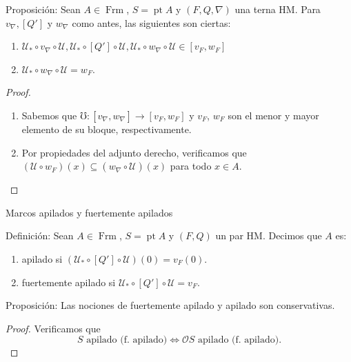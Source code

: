 \documentclass[compress,12pt]{beamer}
\DeclareMathOperator{\pt}{pt}
\DeclareMathOperator{\Frm}{Frm}
\begin{document}
\begin{frame}
\begin{block}{Proposición:}
Sean $A\in \Frm$, $S=\pt A$ y $(F, Q, \nabla)$ una terna HM. Para $v_\nabla, [Q']$ y $w_\nabla$ como antes, las siguientes son ciertas:
\begin{enumerate}
\item $\mathcal{U}_*\circ v_\nabla\circ \mathcal{U}, \mathcal{U}_*\circ [Q']\circ \mathcal{U}, \mathcal{U}_*\circ w_\nabla\circ \mathcal{U}\in [v_F, w_F]$
\item $\mathcal{U}_*\circ w_\nabla\circ \mathcal{U}=w_F$.
\end{enumerate}
\end{block}

\begin{proof}
\begin{enumerate}
\item Sabemos que $\mho\colon [v_\nabla, w_\nabla]\to [v_F, w_F]$ y $v_F$, $w_F$ son el menor y mayor elemento de su bloque, respectivamente.
\item Por propiedades del adjunto derecho, verificamos que $(\mathcal{U}\circ w_F)(x)\subseteq  (w_\nabla\circ \mathcal{U})(x)$ para todo $x\in A$.
\end{enumerate}
\end{proof}
\end{frame}


\begin{frame}{Marcos apilados y fuertemente apilados}
\begin{block}{Definición:}
Sean $A\in \Frm$, $S=\pt A$ y $(F,Q)$ un par HM. Decimos que $A$ es:
\begin{enumerate}
  \item apilado si $(\mathcal{U}_*\circ [Q']\circ\mathcal{U})(0)=v_F(0)$.
  \item fuertemente apilado si $\mathcal{U}_*\circ [Q']\circ \mathcal{U}=v_F$.
\end{enumerate}
\end{block}

\begin{block}{Proposición:}
Las nociones de fuertemente apilado y apilado son conservativas.
\end{block}

\begin{proof}
  Verificamos que 
\[
S \text{ apilado (f. apilado)}\iff \mathcal{O}S \text{ apilado (f. apilado)}.
\]
\end{proof}
\end{frame}
\end{document}
